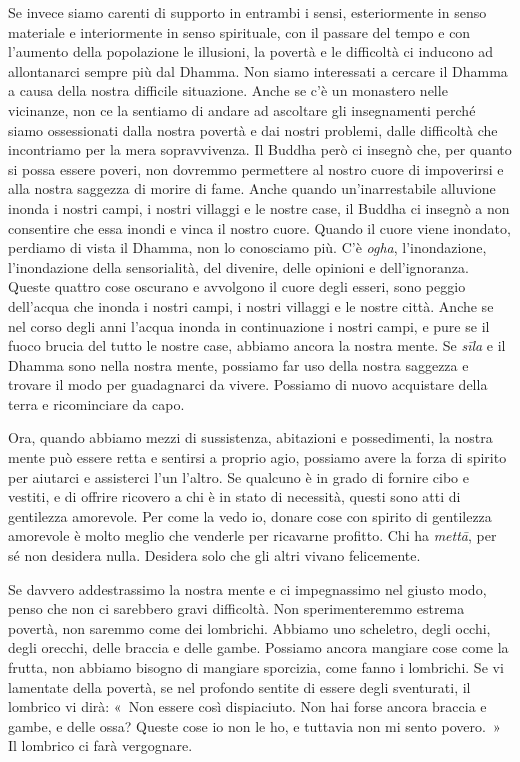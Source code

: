 Se invece siamo carenti di supporto in entrambi i sensi, esteriormente
in senso materiale e interiormente in senso spirituale, con il passare
del tempo e con l'aumento della popolazione le illusioni, la povertà e
le difficoltà ci inducono ad allontanarci sempre più dal Dhamma. Non
siamo interessati a cercare il Dhamma a causa della nostra difficile
situazione. Anche se c'è un monastero nelle vicinanze, non ce la
sentiamo di andare ad ascoltare gli insegnamenti perché siamo
ossessionati dalla nostra povertà e dai nostri problemi, dalle
difficoltà che incontriamo per la mera sopravvivenza. Il Buddha però ci
insegnò che, per quanto si possa essere poveri, non dovremmo permettere
al nostro cuore di impoverirsi e alla nostra saggezza di morire di fame.
Anche quando un'inarrestabile alluvione inonda i nostri campi, i nostri
villaggi e le nostre case, il Buddha ci insegnò a non consentire che
essa inondi e vinca il nostro cuore. Quando il cuore viene inondato,
perdiamo di vista il Dhamma, non lo conosciamo più. C'è \emph{ogha},
l'inondazione, l'inondazione della sensorialità, del divenire, delle
opinioni e dell'ignoranza. Queste quattro cose oscurano e avvolgono il
cuore degli esseri, sono peggio dell'acqua che inonda i nostri campi, i
nostri villaggi e le nostre città. Anche se nel corso degli anni l'acqua
inonda in continuazione i nostri campi, e pure se il fuoco brucia del
tutto le nostre case, abbiamo ancora la nostra mente. Se \emph{sīla} e
il Dhamma sono nella nostra mente, possiamo far uso della nostra
saggezza e trovare il modo per guadagnarci da vivere. Possiamo di nuovo
acquistare della terra e ricominciare da capo.

Ora, quando abbiamo mezzi di sussistenza, abitazioni e possedimenti, la
nostra mente può essere retta e sentirsi a proprio agio, possiamo avere
la forza di spirito per aiutarci e assisterci l'un l'altro. Se qualcuno
è in grado di fornire cibo e vestiti, e di offrire ricovero a chi è in
stato di necessità, questi sono atti di gentilezza amorevole. Per come
la vedo io, donare cose con spirito di gentilezza amorevole è molto
meglio che venderle per ricavarne profitto. Chi ha \emph{mettā}, per sé
non desidera nulla. Desidera solo che gli altri vivano felicemente.

Se davvero addestrassimo la nostra mente e ci impegnassimo nel giusto
modo, penso che non ci sarebbero gravi difficoltà. Non sperimenteremmo
estrema povertà, non saremmo come dei lombrichi. Abbiamo uno scheletro,
degli occhi, degli orecchi, delle braccia e delle gambe. Possiamo ancora
mangiare cose come la frutta, non abbiamo bisogno di mangiare sporcizia,
come fanno i lombrichi. Se vi lamentate della povertà, se nel profondo
sentite di essere degli sventurati, il lombrico vi dirà: «~Non essere
così dispiaciuto. Non hai forse ancora braccia e gambe, e delle ossa?
Queste cose io non le ho, e tuttavia non mi sento povero.~» Il lombrico
ci farà vergognare.

